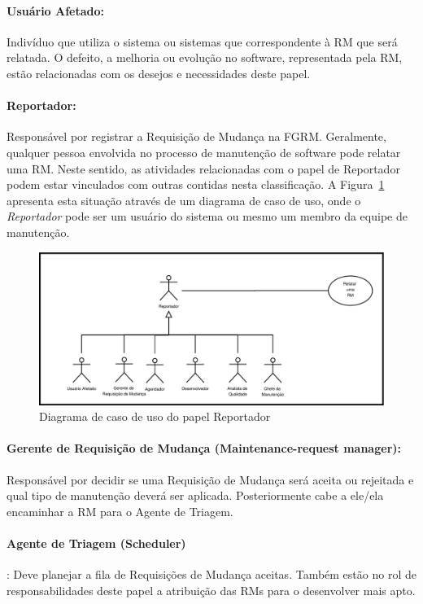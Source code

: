 \paragraph{Usuário Afetado:}
Indivíduo que utiliza o sistema ou sistemas que correspondente à RM que será
relatada. O defeito, a melhoria ou evolução no software, representada pela RM,
estão relacionadas com os desejos e necessidades deste papel.

\paragraph{Reportador:}
Responsável por registrar a Requisição de Mudança na FGRM\@. Geralmente,
qualquer pessoa envolvida no processo de manutenção de software pode relatar uma
RM\@. Neste sentido, as atividades relacionadas com o papel de Reportador podem
estar vinculados com outras contidas nesta classificação. A
Figura~\ref{fig:diagrama-caso-uso-reportador} apresenta esta situação através de
um diagrama de caso de uso, onde o \textit{Reportador} pode ser um usuário do
sistema ou mesmo um membro da equipe de manutenção.

\begin{figure}[htpb]
	\centering
	\includegraphics[width=0.8\linewidth]{./chapter-manutencao-software-visao-geral/img/diagrama-caso-uso-reportador.pdf}
	\caption{Diagrama de caso de uso do papel Reportador}
\label{fig:diagrama-caso-uso-reportador}
\end{figure}

\paragraph{Gerente de Requisição de Mudança (Maintenance-request manager):}
Res\-pon\-sá\-vel por decidir se uma Requisição de Mudança será aceita ou
rejeitada e qual tipo de manutenção deverá ser aplicada. Posteriormente cabe a
ele/ela encaminhar a RM para o Agente de Triagem.

\paragraph{Agente de Triagem (Scheduler)}:
Deve planejar a fila de Requisições de Mudança aceitas. Também estão no rol de
responsabilidades deste papel a atribuição das RMs para o desenvolver mais
apto.

